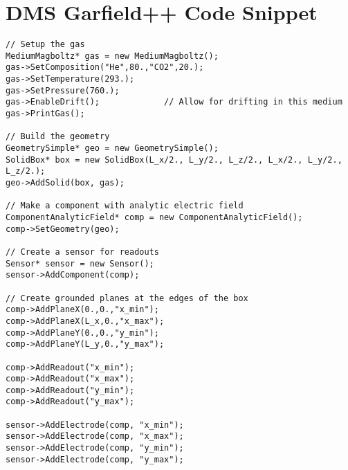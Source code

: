\chapter{DMS Garfield++ Code Snippet}
\label{apdx:B}

\begin{lstlisting} 
// Setup the gas
MediumMagboltz* gas = new MediumMagboltz();
gas->SetComposition("He",80.,"CO2",20.);
gas->SetTemperature(293.);
gas->SetPressure(760.);
gas->EnableDrift();             // Allow for drifting in this medium
gas->PrintGas();

// Build the geometry
GeometrySimple* geo = new GeometrySimple();
SolidBox* box = new SolidBox(L_x/2., L_y/2., L_z/2., L_x/2., L_y/2., L_z/2.);
geo->AddSolid(box, gas);

// Make a component with analytic electric field
ComponentAnalyticField* comp = new ComponentAnalyticField();
comp->SetGeometry(geo);

// Create a sensor for readouts
Sensor* sensor = new Sensor();
sensor->AddComponent(comp);

// Create grounded planes at the edges of the box
comp->AddPlaneX(0.,0.,"x_min");
comp->AddPlaneX(L_x,0.,"x_max");
comp->AddPlaneY(0.,0.,"y_min");
comp->AddPlaneY(L_y,0.,"y_max");

comp->AddReadout("x_min");
comp->AddReadout("x_max");
comp->AddReadout("y_min");
comp->AddReadout("y_max");

sensor->AddElectrode(comp, "x_min");
sensor->AddElectrode(comp, "x_max");
sensor->AddElectrode(comp, "y_min");
sensor->AddElectrode(comp, "y_max");
\end{lstlisting}